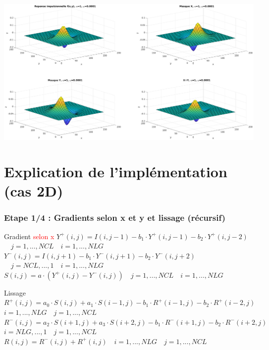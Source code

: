 \documentclass{beamer}
\begin{document}
\begin{frame}
\vspace{0.8cm}
\hspace{-0.3cm}
\centerline{\includegraphics[width=15cm]{Images/Matlab/ResultatsConvolutions/f_X_Y}}


\end{frame}

\section{Explication de l'implémentation (cas 2D)}
\begin{frame}
\frametitle{Etape 1/4 : Gradients selon x et y et lissage (\textbf{récursif})}

\begin{exampleblock}{Gradient \textcolor{red}{selon x}}
$ Y^+(i,j)=I(i,j-1)-b_1 \cdot Y^+(i,j-1)-b_2 \cdot Y^+(i,j-2) $ \\
$ \quad j=1,...,NCL \quad i=1,...,NLG $ \\
\vspace{0.3cm}
$ Y^-(i,j)=I(i,j+1)-b_1 \cdot Y^-(i,j+1) - b_2 \cdot Y^-(i,j+2) $ \\
$ \quad j=NCL,...,1 \quad i= 1,...,NLG $ \\
\vspace{0.3cm}
$ S(i,j)=a \cdot (Y^+(i,j)-Y^-(i,j)) \quad j=1,...,NCL \quad i=1,...,NLG $
\end{exampleblock}

\begin{exampleblock}{Lissage}
$ R^+(i,j)=a_0 \cdot S(i,j) + a_1 \cdot S(i-1,j) - b_1 \cdot R^+(i-1,j) - b_2 \cdot R^+(i-2,j) $ \\
$ i=1,...,NLG \quad j=1,...,NCL $ \\
\vspace{0.3cm}
$ R^-(i,j) = a_2 \cdot S(i+1,j) + a_3 \cdot S(i+2,j) - b_1 \cdot R^-(i+1,j) - b_2 \cdot R^-(i+2,j) $ \\
$ i=NLG,...,1 \quad j=1,...,NCL $ \\
\vspace{0.3cm}
$ R(i,j)=R^-(i,j) + R^+(i,j) \quad i=1,...,NLG \quad j=1,...,NCL $
\end{exampleblock}

\end{frame}
\end{document}

